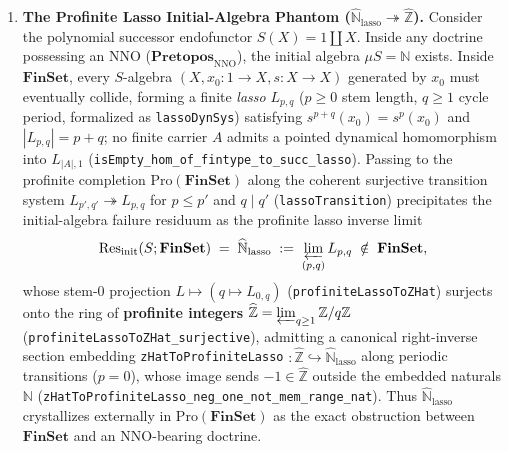 \documentclass[10pt,twoside,openright]{book}
\theoremstyle{crmplain}
\theoremstyle{crmdef}
\theoremstyle{crmremark}
\begin{document}
\begin{enumerate}[label=\textbf{\arabic*.},leftmargin=1.8em]

  \item \textbf{The Profinite Lasso Initial-Algebra Phantom ($\widehat{\mathbb{N}}_{\mathrm{lasso}} \twoheadrightarrow \widehat{\mathbb{Z}}$).} Consider the polynomial successor endofunctor $S(X) = 1 \amalg X$. Inside any doctrine possessing an $\mathrm{NNO}$ ($\mathbf{Pretopos}_{\mathrm{NNO}}$), the initial algebra $\mu S = \mathbb{N}$ exists. Inside $\mathbf{FinSet}$, every $S$-algebra $(X, x_0 : 1 \to X, s : X \to X)$ generated by $x_0$ must eventually collide, forming a finite \emph{lasso} $L_{p,q}$ ($p \ge 0$ stem length, $q \ge 1$ cycle period, formalized as \texttt{lassoDynSys}) satisfying $s^{p+q}(x_0) = s^p(x_0)$ and $|L_{p,q}| = p + q$; no finite carrier $A$ admits a pointed dynamical homomorphism into $L_{|A|, 1}$ (\texttt{isEmpty\_\allowbreak hom\_\allowbreak of\_\allowbreak fintype\_\allowbreak to\_\allowbreak succ\_\allowbreak lasso}). Passing to the profinite completion $\mathrm{Pro}(\mathbf{FinSet})$ along the coherent surjective transition system $L_{p', q'} \twoheadrightarrow L_{p, q}$ for $p \le p'$ and $q \mid q'$ (\texttt{lassoTransition}) precipitates the initial-algebra failure residuum as the profinite lasso inverse limit
  \[
    \mathrm{Res}_{\mathrm{init}}(S; \mathbf{FinSet}) \;=\; \widehat{\mathbb{N}}_{\mathrm{lasso}} \;:=\; \varprojlim_{(p,q)} L_{p,q} \;\notin\; \mathbf{FinSet},
  \]
  whose stem-$0$ projection $L \mapsto (q \mapsto L_{0, q})$ (\texttt{profiniteLassoToZHat}) surjects onto the ring of \textbf{profinite integers} $\widehat{\mathbb{Z}} = \varprojlim_{q \ge 1} \mathbb{Z}/q\mathbb{Z}$ (\texttt{profiniteLassoToZHat\_\allowbreak surjective}), admitting a canonical right-inverse section embedding \texttt{zHatToProfiniteLasso} $\colon \widehat{\mathbb{Z}} \hookrightarrow \widehat{\mathbb{N}}_{\mathrm{lasso}}$ along periodic transitions ($p = 0$), whose image sends $-1 \in \widehat{\mathbb{Z}}$ outside the embedded naturals $\mathbb{N}$ (\texttt{zHatToProfiniteLasso\_\allowbreak neg\_\allowbreak one\_\allowbreak not\_\allowbreak mem\_\allowbreak range\_\allowbreak nat}). Thus $\widehat{\mathbb{N}}_{\mathrm{lasso}}$ crystallizes externally in $\mathrm{Pro}(\mathbf{FinSet})$ as the exact obstruction between $\mathbf{FinSet}$ and an $\mathrm{NNO}$-bearing doctrine.


\end{enumerate}
\end{document}
